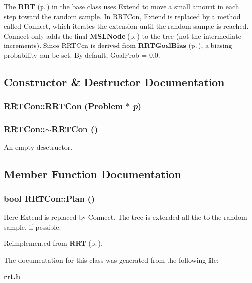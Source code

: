 The {\bf RRT} {\rm (p.\,\pageref{class_RRT})} in the base class uses Extend to move a small amount in each step toward the random sample. In RRTCon, Extend is replaced by a method called Connect, which iterates the extension until the random sample is reached. Connect only adds the final  {\bf MSLNode} {\rm (p.\,\pageref{class_MSLNode})} to the tree (not the intermediate increments). Since RRTCon is derived from {\bf RRTGoal\-Bias} {\rm (p.\,\pageref{class_RRTGoalBias})}, a biasing probability can be set. By default, Goal\-Prob = 0.0. 



\subsection{Constructor \& Destructor Documentation}
\subsubsection{\setlength{\rightskip}{0pt plus 5cm}RRTCon::RRTCon ({\bf Problem} $\ast$ {\em p})}\label{class_RRTCon_a0}


\subsubsection{\setlength{\rightskip}{0pt plus 5cm}RRTCon::$\sim$RRTCon ()\hspace{0.3cm}{\tt  [inline, virtual]}}\label{class_RRTCon_a1}


An empty desctructor.



\subsection{Member Function Documentation}
\subsubsection{\setlength{\rightskip}{0pt plus 5cm}bool RRTCon::Plan ()\hspace{0.3cm}{\tt  [virtual]}}\label{class_RRTCon_a2}


Here Extend is replaced by Connect. The tree is extended all the to the random sample, if possible.



Reimplemented from {\bf RRT} {\rm (p.\,\pageref{class_RRT_a3})}.

The documentation for this class was generated from the following file:\begin{CompactItemize}
\item 
{\bf rrt.h}\end{CompactItemize}
